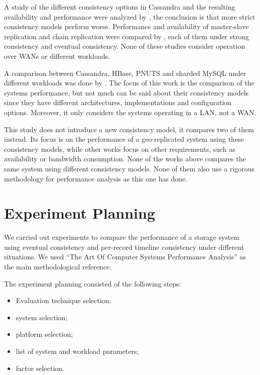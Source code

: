 \documentclass[man,floatsintext,12pt]{apa6}
\begin{document}
A study of the different consistency options in Cassandra and the resulting
availability and performance were analyzed by \textcites{Beyer2011}, the
conclusion is that more strict consistency models perform worse. Performance
and availability of master-slave replication and chain replication were
compared by \textcites{vanRenesse2004}, each of them under strong consistency
and eventual consistency. None of these studies consider operation over WANs or
different workloads.

A comparison between Cassandra, HBase, PNUTS and sharded MySQL under different
workloads was done by \textcites{Cooper2010}. The focus of this work is the
comparison of the systems performance, but not much can be said about their
consistency models since they have different architectures, implementations and
configuration options. Moreover, it only considers the systems operating in a
LAN, not a WAN.

This study does not introduce a new consistency model, it compares two of them
instead. Its focus is on the performance of a geo-replicated system using these
consistency models, while other works focus on other requirements, such as
availability or bandwidth consumption. None of the works above compares the
same system using different consistency models. None of them also use a
rigorous methodology for performance analysis as this one has done.

\section{Experiment Planning}

We carried out experiments to compare the performance of a storage system using
eventual consistency and per-record timeline consistency under different
situations. We used ``The Art Of Computer Systems Performance Analysis''
\parencite{Jain1991} as the main methodological reference.

The experiment planning consisted of the following steps:

\begin{itemize}
\item Evaluation technique selection;
\item system selection;
\item platform selection;
\item list of system and workload parameters;
\item factor selection.
\end{itemize}
\end{document}
